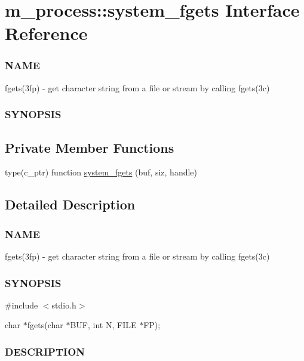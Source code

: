 \hypertarget{interfacem__process_1_1system__fgets}{}\section{m\+\_\+process\+:\+:system\+\_\+fgets Interface Reference}
\label{interfacem__process_1_1system__fgets}


\subsubsection*{N\+A\+ME}

fgets(3fp) -\/ get character string from a file or stream by calling fgets(3c) \subsubsection*{S\+Y\+N\+O\+P\+S\+IS} 


\subsection*{Private Member Functions}
\begin{DoxyCompactItemize}
\item 
type(c\+\_\+ptr) function \mbox{\hyperlink{interfacem__process_1_1system__fgets_a33f5f4ba1ea0fe4e0b757d7fa5e8a571}{system\+\_\+fgets}} (buf, siz, handle)
\end{DoxyCompactItemize}


\subsection{Detailed Description}
\subsubsection*{N\+A\+ME}

fgets(3fp) -\/ get character string from a file or stream by calling fgets(3c) \subsubsection*{S\+Y\+N\+O\+P\+S\+IS}

\#include $<$stdio.\+h$>$

char $\ast$fgets(char $\ast$\+B\+UF, int N, F\+I\+LE $\ast$\+FP); \subsubsection*{D\+E\+S\+C\+R\+I\+P\+T\+I\+ON}

